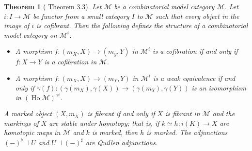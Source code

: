 \documentclass[a4paper]{article}
\newtheorem{theorem}{Theorem}
\theoremstyle{remark}
\theoremstyle{definition}
\begin{document}
\begin{theorem}[\cite{marked-objects} Theorem 3.3]
  \label{th:marked-model-category}
  Let $\mathcal{M}$ be a combinatorial model category $\mathcal{M}$.
  Let $i : I \rightarrow \mathcal{M}$ be functor from a small category $I$ to $\mathcal{M}$ such that every object in the image of $i$ is cofibrant.
  Then the following defines the structure of a combinatorial model category on $\mathcal{M}^i$:
  \begin{itemize}
    \item
      A morphism $f : (m_X, X) \rightarrow (m_y, Y)$ in $\mathcal{M}^i$ is a cofibration if and only if $f : X \rightarrow Y$ is a cofibration in $\mathcal{M}$.
    \item
      A morphism $f : (m_X, X) \rightarrow (m_Y, Y)$ in $\mathcal{M}^i$ is a weak equivalence if and only if $\gamma(f) : (\gamma(m_X), \gamma(X)) \rightarrow (\gamma(m_Y), \gamma(Y))$ is an isomorphism in $(\operatorname{Ho} \mathcal{M})^{\gamma i}$.
  \end{itemize}
  A marked object $(X, m_X)$ is fibrant if and only if $X$ is fibrant in $\mathcal{M}$ and the markings of $X$ are stable under homotopy; that is, if $k \simeq h : i(K) \rightarrow X$ are homotopic maps in $\mathcal{M}$ and $k$ is marked, then $h$ is marked.
  The adjunctions $(-)^\flat \dashv U$ and $U \dashv (-)^\sharp$ are Quillen adjunctions.
\end{theorem}
\end{document}
